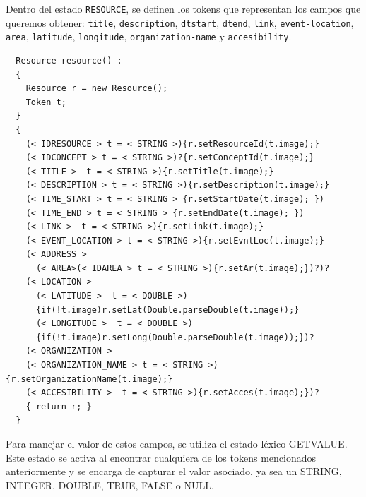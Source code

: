 Dentro del estado \lstinline{RESOURCE}, se definen los tokens que representan los campos que queremos obtener: \lstinline{title}, \lstinline{description}, \lstinline{dtstart}, \lstinline{dtend}, \lstinline{link}, \lstinline{event-location}, \lstinline{area}, \lstinline{latitude}, \lstinline{longitude}, \lstinline{organization-name} y \lstinline{accesibility}.

\begin{lstlisting}
  Resource resource() :
  {
    Resource r = new Resource();
    Token t;
  }
  {
    (< IDRESOURCE > t = < STRING >){r.setResourceId(t.image);}
    (< IDCONCEPT > t = < STRING >)?{r.setConceptId(t.image);}  
    (< TITLE >  t = < STRING >){r.setTitle(t.image);}
    (< DESCRIPTION > t = < STRING >){r.setDescription(t.image);}
    (< TIME_START > t = < STRING > {r.setStartDate(t.image); })
    (< TIME_END > t = < STRING > {r.setEndDate(t.image); })
    (< LINK >  t = < STRING >){r.setLink(t.image);}
    (< EVENT_LOCATION > t = < STRING >){r.setEvntLoc(t.image);}
    (< ADDRESS > 
      (< AREA>(< IDAREA > t = < STRING >){r.setAr(t.image);})?)?
    (< LOCATION >
      (< LATITUDE >  t = < DOUBLE >)
      {if(!t.image)r.setLat(Double.parseDouble(t.image));}
      (< LONGITUDE >  t = < DOUBLE >)
      {if(!t.image)r.setLong(Double.parseDouble(t.image));})?
    (< ORGANIZATION >
    (< ORGANIZATION_NAME > t = < STRING >){r.setOrganizationName(t.image);}
    (< ACCESIBILITY >  t = < STRING >){r.setAcces(t.image);})? 
    { return r; }
  }
\end{lstlisting}

Para manejar el valor de estos campos, se utiliza el estado léxico GETVALUE. Este estado se activa al encontrar cualquiera de los tokens mencionados anteriormente y se encarga de capturar el valor asociado, ya sea un STRING, INTEGER, DOUBLE, TRUE, FALSE o NULL.

